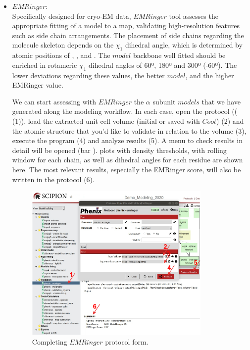 \begin{itemize}

 \item $EMRinger$:\\
 
 Specifically designed for cryo-EM data, $EMRinger$ tool assesses the appropriate fitting of a model to a map, validating high-resolution features such as side chain arrangements. The placement of side chains regarding the molecule skeleton depends on the $\chi_{1}$ dihedral angle, which is determined by atomic positions of , ,  and . The $model$ backbone well fitted should be enriched in rotameric $\chi_{1}$ dihedral angles of 60º, 180º and 300º (-60º). The lower deviations regarding these values, the better $model$, and the higher EMRinger value.  
 
 We can start assessing with $EMRinger$ the  $\alpha$ subunit $models$ that we have generated along the modeling workflow. In each case, open the  protocol (( (1)), load the extracted unit cell volume (initial or saved with $Coot$) (2) and the atomic structure that you'd like to validate in relation to the volume (3), execute the program (4) and analyze results (5). A menu to check results in detail will be opened (bar ).  plots with density thresholds, with rolling window for each chain, as well as dihedral angles for each residue are shown here. The most relevant results, especially the EMRinger score, will also be written in the protocol  (6). 
 
  \begin{figure}[H]
  \centering 
  \captionsetup{width=.7\linewidth} 
  \includegraphics[width=0.85\textwidth]{Images/Fig34}
  \caption{Completing $EMRinger$ protocol form.}
  \label{fig:emringer_protocol}
  \end{figure}
 

\end{itemize}
